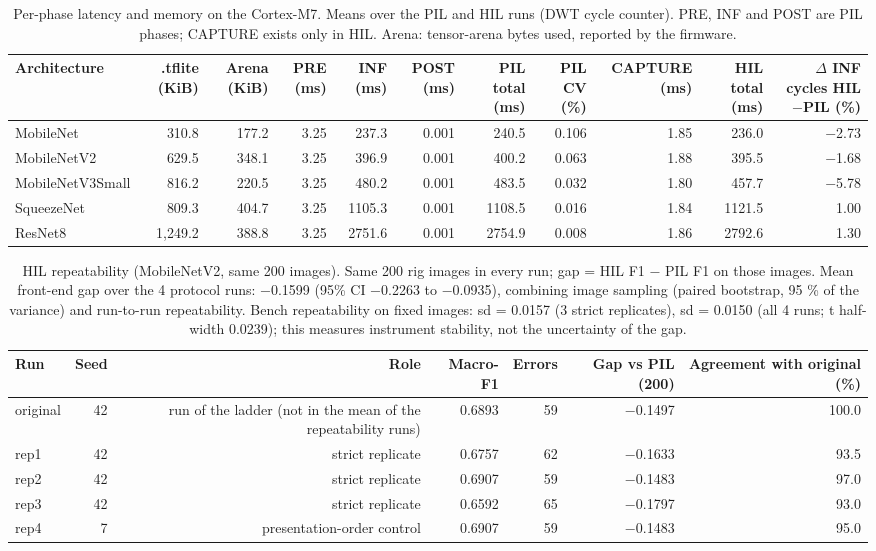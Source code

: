 \begin{table}[htbp]
\centering
\scriptsize
\caption{Per-phase latency and memory on the Cortex-M7. Means over the PIL and HIL runs (DWT cycle counter). PRE, INF and POST are PIL phases; CAPTURE exists only in HIL. Arena: tensor-arena bytes used, reported by the firmware.}
\label{tab:ladder-coco-3}
\begin{tabular}{lrrrrrrrrrr}
\toprule
Architecture & .tflite (KiB) & Arena (KiB) & PRE (ms) & INF (ms) & POST (ms) & PIL total (ms) & PIL CV (\%) & CAPTURE (ms) & HIL total (ms) & $\Delta$ INF cycles HIL$-$PIL (\%) \\
\midrule
MobileNet & 310.8 & 177.2 & 3.25 & 237.3 & 0.001 & 240.5 & 0.106 & 1.85 & 236.0 & $-$2.73 \\
MobileNetV2 & 629.5 & 348.1 & 3.25 & 396.9 & 0.001 & 400.2 & 0.063 & 1.88 & 395.5 & $-$1.68 \\
MobileNetV3Small & 816.2 & 220.5 & 3.25 & 480.2 & 0.001 & 483.5 & 0.032 & 1.80 & 457.7 & $-$5.78 \\
SqueezeNet & 809.3 & 404.7 & 3.25 & 1105.3 & 0.001 & 1108.5 & 0.016 & 1.84 & 1121.5 & 1.00 \\
ResNet8 & 1,249.2 & 388.8 & 3.25 & 2751.6 & 0.001 & 2754.9 & 0.008 & 1.86 & 2792.6 & 1.30 \\
\bottomrule
\end{tabular}
\end{table}

\begin{table}[htbp]
\centering
\scriptsize
\caption{HIL repeatability (MobileNetV2, same 200 images). Same 200 rig images in every run; gap = HIL F1 $-$ PIL F1 on those images. Mean front-end gap over the 4 protocol runs: $-$0.1599 (95\% CI $-$0.2263 to $-$0.0935), combining image sampling (paired bootstrap, 95 \% of the variance) and run-to-run repeatability. Bench repeatability on fixed images: sd = 0.0157 (3 strict replicates), sd = 0.0150 (all 4 runs; t half-width 0.0239); this measures instrument stability, not the uncertainty of the gap.}
\label{tab:ladder-coco-4}
\begin{tabular}{lrrrrrr}
\toprule
Run & Seed & Role & Macro-F1 & Errors & Gap vs PIL (200) & Agreement with original (\%) \\
\midrule
original & 42 & run of the ladder (not in the mean of the repeatability runs) & 0.6893 & 59 & $-$0.1497 & 100.0 \\
rep1 & 42 & strict replicate & 0.6757 & 62 & $-$0.1633 & 93.5 \\
rep2 & 42 & strict replicate & 0.6907 & 59 & $-$0.1483 & 97.0 \\
rep3 & 42 & strict replicate & 0.6592 & 65 & $-$0.1797 & 93.0 \\
rep4 & 7 & presentation-order control & 0.6907 & 59 & $-$0.1483 & 95.0 \\
\bottomrule
\end{tabular}
\end{table}

